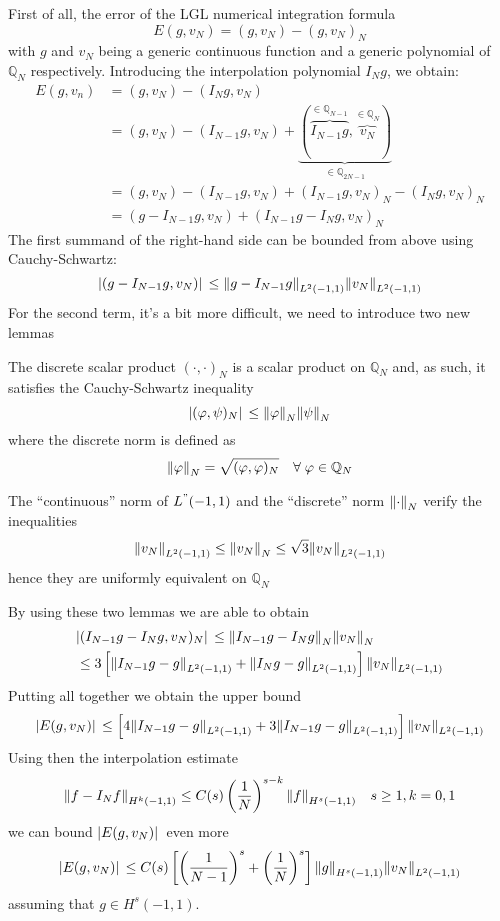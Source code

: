 First of all, the error of the LGL numerical integration formula 
\[
    E(g, v_N) = (g, v_N) - (g, v_N)_N
\]
with \(g\) and \(v_N\) being a generic continuous function and a generic polynomial of \(\mathbb{Q}_N\) respectively. Introducing the interpolation polynomial \(I_Ng\), we obtain:
\begin{align*}
    E(g, v_n) &= (g, v_N) - (I_Ng, v_N) \\
    &= (g, v_N) - (I_{N-1}g, v_N) + \underbrace{(\overbrace{I_{N-1}g}^{\in \mathbb{Q}_{N-1}}, \overbrace{v_N}^{\in \mathbb{Q}_N})}_{\in \mathbb{Q}_{2N-1}} \\
    &= (g, v_N) - (I_{N-1}g, v_N) +(I_{N-1}g, v_N)_N - (I_{N}g, v_N)_N \\
    &= (g - I_{N-1}g, v_N) + (I_{N-1}g - I_N g, v_N)_N
\end{align*}
The first summand of the right-hand side can be bounded from above using Cauchy-Schwartz:
\[
    \abs*{(g-I_{N-1}g, v_N)} \leq \norm{g-I_{N-1}g}_{L^2(-1,1)}\norm{v_N}_{L^2(-1,1)}
\]
For the second term, it's a bit more difficult, we need to introduce two new lemmas
\begin{lemma}
    The discrete scalar product \((\cdot, \cdot)_N\) is a scalar product on \(\mathbb{Q}_N\) and, as such, it satisfies the Cauchy-Schwartz inequality
    \[
        \abs*{(\varphi, \psi)_N} \leq \norm{\varphi}_N \norm{\psi}_N
    \]
    where the discrete norm is defined as 
    \[
        \norm{\varphi}_N = \sqrt{(\varphi, \varphi)_N} \quad \forall \; \varphi \in \mathbb{Q}_N
    \]
\end{lemma}
\begin{lemma}
    The ``continuous'' norm of \(L^"(-1,1)\) and the ``discrete'' norm \(\norm{\cdot}_N\) verify the inequalities
    \[
        \norm{v_N}_{L^2(-1,1)} \leq \norm{v_N}_N \leq \sqrt{3}\norm{v_N}_{L^2(-1,1)}
    \]
    hence they are uniformly equivalent on \(\mathbb{Q}_N\)
\end{lemma}
By using these two lemmas we are able to obtain 
\begin{equation*}
    \begin{split}
        &\abs*{(I_{N-1}g - I_Ng, v_N)_N} \leq \norm{I_{N-1}g - I_Ng}_N \norm{v_N}_N  \\
        &\leq 3 \left[\norm{I_{N-1}g-g}_{L^2(-1,1)} + \norm{I_{N}g-g}_{L^2(-1,1)}\right] \norm{v_N}_{L^2(-1,1)}
    \end{split}
\end{equation*}
Putting all together we obtain the upper bound 
\[
    \abs*{E(g,v_N)} \leq \left[4\norm{I_{N-1}g-g}_{L^2(-1,1)} + 3 \norm{I_{N-1}g-g}_{L^2(-1,1)} \right] \norm{v_N}_{L^2(-1,1)}
\]
Using then the interpolation estimate 
\[
    \norm{f- I_Nf}_{H^k(-1,1)} \leq C(s)\left(\frac{1}{N}\right)^{s-k} \norm{f}_{H^s(-1,1)} \quad s \geq 1, k = 0,1
\]
we can bound \(\abs*{E(g,v_N)}\) even more
\[
    \abs*{E(g,v_N)} \leq C(s)\left[\left(\frac{1}{N-1}\right)^s + \left(\frac{1}{N}\right)^s\right] \norm{g}_{H^s(-1,1)} \norm{v_N}_{L^2(-1,1)}
\]
assuming that \(g \in H^s(-1,1)\).

